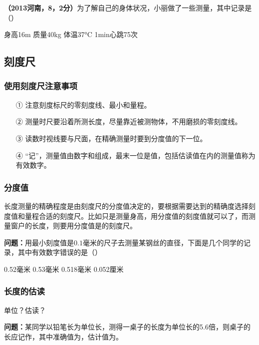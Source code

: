 \documentclass[12pt]{exam}%
\begin{document}
\begin{knowledge}
\textbf{（2013河南，8，2分）}为了解自己的身体状况，小丽做了一些测量，其中记录是（\answerline*[A]）

\begin{oneparchoices}
\choice 身高16m
\choice 质量40kg
\choice 体温37\si{\degreeCelsius}
\choice 1min心跳75次
\end{oneparchoices}


\subsection{刻度尺}
\subsubsection{使用刻度尺注意事项}
\begin{enumerate}
\item[①] 注意刻度标尺的零刻度线、最小\answerline*[分度值]和量程。
\item[②] 测量时尺要沿着所测长度，尽量靠近被测物体，不用磨损的零刻度线。
\item[③] 读数时视线要与尺面\answerline*[垂直]，在精确测量时要到分度值的下一位。
\item[④] “记”，测量值由数字和\answerline*[单位]组成，最末一位是\answerline*[估读]值，包括估读值在内的测量值称为有效数字。
\end{enumerate}

\subsubsection{分度值}
长度测量的精确程度是由刻度尺的分度值决定的，要根据需要达到的精确度选择刻度值和量程合适的刻度尺。比如只是测量身高，用分度值\answerline*[cm]的刻度值就可以了，而测量窗户的长度，则要用分度值是\answerline*[mm]的刻度尺。

\textbf{问题：}用最小刻度值是$0.1$毫米的尺子去测量某钢丝的直径，下面是几个同学的记录，其中有效数字错误的是（\answerline*[C]）

\begin{oneparchoices}
\choice 0.52毫米
\choice 0.53毫米
\choice 0.518毫米
\choice 0.052厘米
\end{oneparchoices}


\subsubsection{长度的估读}
单位？估读？

\textbf{问题：}某同学以铅笔长为单位长，测得一桌子的长度为单位长的5.6倍，则桌子的长应记作，其中准确值为\answerline*[5铅笔长]，估计值为。



\end{knowledge}
\end{document}

